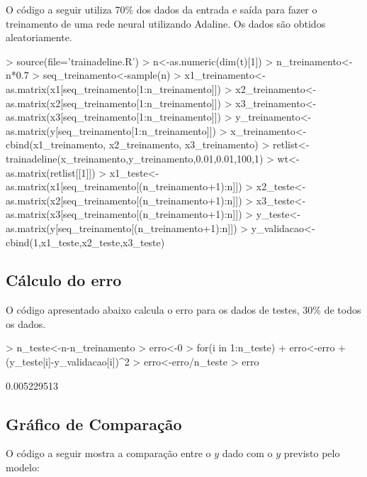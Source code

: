 \documentclass{article}
\begin{document}
O código a seguir utiliza 70\% dos dados da entrada e saída para fazer o treinamento de uma rede neural utilizando Adaline. Os dados são obtidos aleatoriamente.

\begin{Schunk}
\begin{Sinput}
>   source(file='trainadeline.R')
>   n<-as.numeric(dim(t)[1])
>   n_treinamento<-n*0.7
>   seq_treinamento<-sample(n)
>   x1_treinamento<-as.matrix(x1[seq_treinamento[1:n_treinamento]])
>   x2_treinamento<-as.matrix(x2[seq_treinamento[1:n_treinamento]])
>   x3_treinamento<-as.matrix(x3[seq_treinamento[1:n_treinamento]])
>   y_treinamento<-as.matrix(y[seq_treinamento[1:n_treinamento]])
>   x_treinamento<-cbind(x1_treinamento, x2_treinamento, x3_treinamento)
>   retlist<-trainadeline(x_treinamento,y_treinamento,0.01,0.01,100,1)
>   wt<-as.matrix(retlist[[1]])
>   x1_teste<-as.matrix(x1[seq_treinamento[(n_treinamento+1):n]])
>   x2_teste<-as.matrix(x2[seq_treinamento[(n_treinamento+1):n]])
>   x3_teste<-as.matrix(x3[seq_treinamento[(n_treinamento+1):n]])
>   y_teste<-as.matrix(y[seq_treinamento[(n_treinamento+1):n]])
>   y_validacao<-cbind(1,x1_teste,x2_teste,x3_teste) %
\end{Sinput}
\end{Schunk}

\subsection{Cálculo do erro}

O código apresentado abaixo calcula o erro para os dados de testes, 30\% de todos os dados.

\begin{Schunk}
\begin{Sinput}
>   n_teste<-n-n_treinamento
>   erro<-0
>   for(i in 1:n_teste)
+     erro<-erro + (y_teste[i]-y_validacao[i])^2
>   erro<-erro/n_teste
>   erro  
\end{Sinput}
\begin{Soutput}
[1] 0.005229513
\end{Soutput}
\end{Schunk}

\subsection{Gráfico de Comparação}

O código a seguir mostra a comparação entre o $y$ dado com o $y$ previsto pelo modelo:
\end{document}
